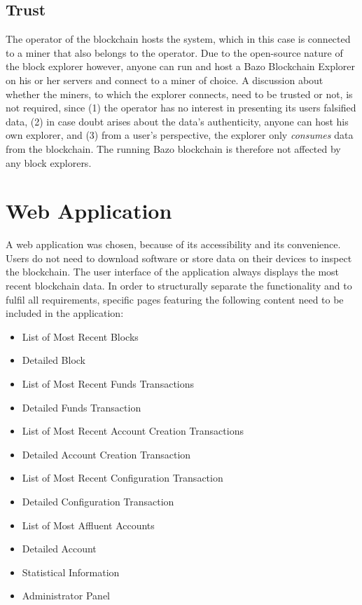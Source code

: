\subsection{Trust}
The operator of the blockchain hosts the system, which in this case is connected to a miner that also belongs to the operator. Due to the open-source nature of the block explorer however, anyone can run and host a Bazo Blockchain Explorer on his or her servers and connect to a miner of choice. A discussion about whether the miners, to which the explorer connects, need to be trusted or not, is not required, since (1) the operator has no interest in presenting its users falsified data, (2) in case doubt arises about the data's authenticity, anyone can host his own explorer, and (3) from a user's perspective, the explorer only \emph{consumes} data from the blockchain. The running Bazo blockchain is therefore not affected by any block explorers.

\section{Web Application}
A web application was chosen, because of its accessibility and its convenience. Users do not need to download software or store data on their devices to inspect the blockchain. 
The user interface of the application always displays the most recent blockchain data.  In order to structurally separate the functionality and to fulfil all requirements, specific pages featuring the following content need to be included in the application:

\begin{itemize}
\item{List of Most Recent Blocks}
\item{Detailed Block}
\item{List of Most Recent Funds Transactions}
\item{Detailed Funds Transaction}
\item{List of Most Recent Account Creation Transactions}
\item{Detailed Account Creation Transaction}
\item{List of Most Recent Configuration Transaction}
\item{Detailed Configuration Transaction}
\item{List of Most Affluent Accounts}
\item{Detailed Account}
\item{Statistical Information}
\item{Administrator Panel}
\end{itemize}

